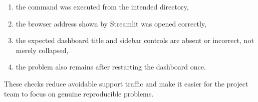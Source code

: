 \begin{enumerate}
    \item the command was executed from the intended directory,
    \item the browser address shown by Streamlit was opened correctly,
    \item the expected dashboard title and sidebar controls are absent or incorrect, not merely collapsed,
    \item the problem also remains after restarting the dashboard once.
\end{enumerate}

These checks reduce avoidable support traffic and make it easier for the project team to focus on genuine reproducible problems.
